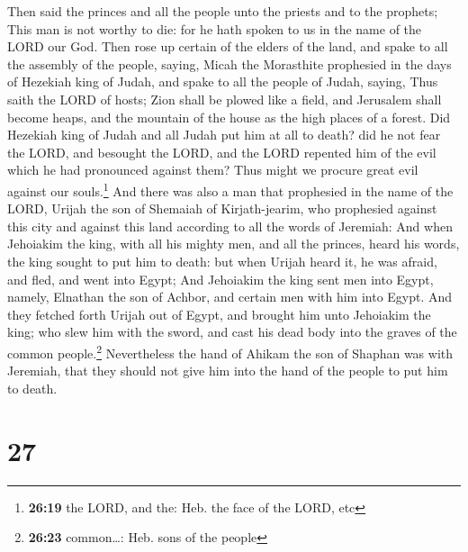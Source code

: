  Then said the princes and all the people unto the
priests and to the prophets; This man is not worthy to die: for he hath
spoken to us in the name of the LORD our God.  Then rose
up certain of the elders of the land, and spake to all the assembly of
the people, saying,  Micah the Morasthite prophesied in
the days of Hezekiah king of Judah, and spake to all the people of
Judah, saying, Thus saith the LORD of hosts; Zion shall be plowed like a
field, and Jerusalem shall become heaps, and the mountain of the house
as the high places of a forest.  Did Hezekiah king of
Judah and all Judah put him at all to death? did he not fear the LORD,
and besought the LORD, and the LORD repented him of the evil which he
had pronounced against them? Thus might we procure great evil against
our souls.\footnote{\textbf{26:19} the LORD, and the: Heb. the face of
  the LORD, etc}  And there was also a man that
prophesied in the name of the LORD, Urijah the son of Shemaiah of
Kirjath-jearim, who prophesied against this city and against this land
according to all the words of Jeremiah:  And when
Jehoiakim the king, with all his mighty men, and all the princes, heard
his words, the king sought to put him to death: but when Urijah heard
it, he was afraid, and fled, and went into Egypt;  And
Jehoiakim the king sent men into Egypt, namely, Elnathan the son of
Achbor, and certain men with him into Egypt.  And they
fetched forth Urijah out of Egypt, and brought him unto Jehoiakim the
king; who slew him with the sword, and cast his dead body into the
graves of the common people.\footnote{\textbf{26:23} common\ldots: Heb.
  sons of the people}  Nevertheless the hand of Ahikam
the son of Shaphan was with Jeremiah, that they should not give him into
the hand of the people to put him to death.

\hypertarget{section-26}{%
\section{27}\label{section-26}}

